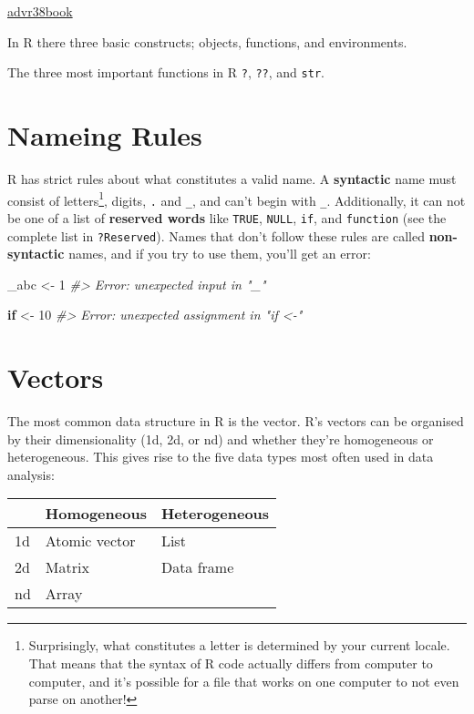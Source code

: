 \documentclass[]{book}
\newenvironment{Shaded}{\begin{snugshade}}{\end{snugshade}}
\newcommand{\DecValTok}[1]{\textcolor[rgb]{0.00,0.00,0.81}{#1}}
\newcommand{\StringTok}[1]{\textcolor[rgb]{0.31,0.60,0.02}{#1}}
\newcommand{\CommentTok}[1]{\textcolor[rgb]{0.56,0.35,0.01}{\textit{#1}}}
\newcommand{\ControlFlowTok}[1]{\textcolor[rgb]{0.13,0.29,0.53}{\textbf{#1}}}
\newcommand{\NormalTok}[1]{#1}
\let\rmarkdownfootnote\footnote%
\def\footnote{\protect\rmarkdownfootnote}
\theoremstyle{definition}
\theoremstyle{definition}
\theoremstyle{definition}
\theoremstyle{remark}
\begin{document}
\href{https://privefl.github.io/advr38book/r-programming.html}{advr38book}

In R there three basic constructs; objects, functions, and environments.

The three most important functions in R \texttt{?}, \texttt{??}, and
\texttt{str}.

\section{Nameing Rules}\label{nameing-rules}

R has strict rules about what constitutes a valid name. A
\textbf{syntactic} name must consist of letters\footnote{Surprisingly,
  what constitutes a letter is determined by your current locale. That
  means that the syntax of R code actually differs from computer to
  computer, and it's possible for a file that works on one computer to
  not even parse on another!}, digits, \texttt{.} and \texttt{\_}, and
can't begin with \texttt{\_}. Additionally, it can not be one of a list
of \textbf{reserved words} like \texttt{TRUE}, \texttt{NULL},
\texttt{if}, and \texttt{function} (see the complete list in
\texttt{?Reserved}). Names that don't follow these rules are called
\textbf{non-syntactic} names, and if you try to use them, you'll get an
error:

\begin{Shaded}
\begin{Highlighting}[]
\NormalTok{_abc <-}\StringTok{ }\DecValTok{1}
\CommentTok{#> Error: unexpected input in "_"}

\ControlFlowTok{if}\NormalTok{ <-}\StringTok{ }\DecValTok{10}
\CommentTok{#> Error: unexpected assignment in "if <-"}
\end{Highlighting}
\end{Shaded}

\section{Vectors}\label{vectors}

The most common data structure in R is the vector. R's vectors can be
organised by their dimensionality (1d, 2d, or nd) and whether they're
homogeneous or heterogeneous. This gives rise to the five data types
most often used in data analysis:

\begin{longtable}[]{@{}lll@{}}
\toprule
& Homogeneous & Heterogeneous\tabularnewline
\midrule
\endhead
1d & Atomic vector & List\tabularnewline
2d & Matrix & Data frame\tabularnewline
nd & Array &\tabularnewline
\bottomrule
\end{longtable}
\end{document}
